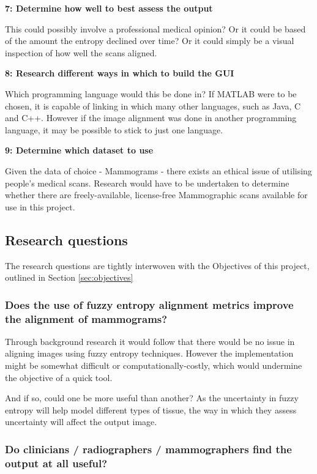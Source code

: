\noindent \textbf{7: Determine how well to best assess the output}

This could possibly involve a professional medical opinion? Or it could be based of the amount the entropy declined over time? Or it could simply be a visual inspection of how well the scans aligned.

\noindent \textbf{8: Research different ways in which to build the \acrshort{GUI}}

Which programming language would this be done in? If MATLAB were to be chosen, it is capable of linking in which many other languages, such as Java, C and C++. However if the image alignment was done in another programming language, it may be possible to stick to just one language.

\noindent \textbf{9: Determine which dataset to use}

Given the data of choice - Mammograms - there exists an ethical issue of utilising people's medical scans. Research would have to be undertaken to determine whether there are freely-available, license-free Mammographic scans available for use in this project.

\subsection{Research questions}
\label{ssec:research-qs}

The research questions are tightly interwoven with the Objectives of this project, outlined in Section \ref{sec:objectives}

\subsubsection{Does the use of fuzzy entropy alignment metrics improve the alignment of mammograms?}

Through background research it would follow that there would be no issue in aligning images using fuzzy entropy techniques. However the implementation might be somewhat difficult or computationally-costly, which would undermine the objective of a quick tool.

And if so, could one be more useful than another? As the uncertainty in fuzzy entropy will help model different types of tissue, the way in which they assess uncertainty will affect the output image.

\subsubsection{Do clinicians / radiographers / mammographers find the output at all useful?}

